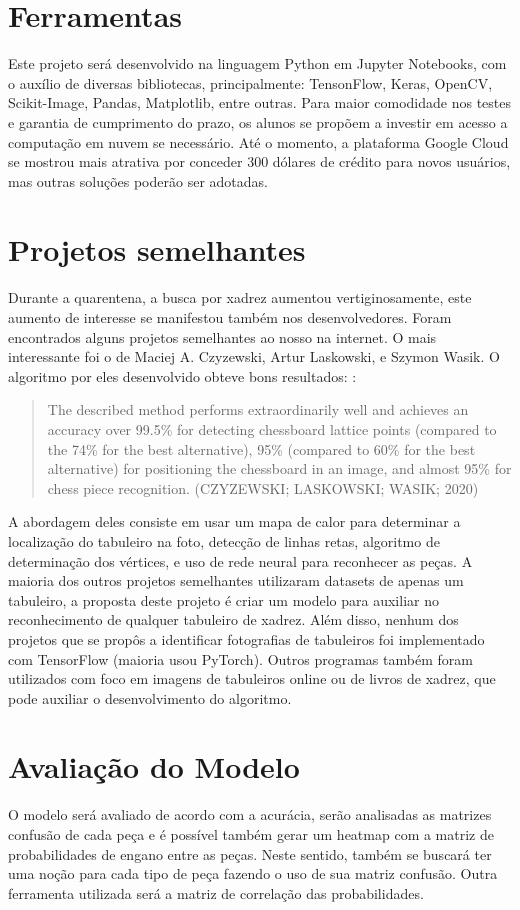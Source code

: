 \documentclass[a4paper,12pt,twoside]{article}
\begin{document}
\section{Ferramentas}
Este projeto será desenvolvido na linguagem Python em Jupyter Notebooks, com o auxílio de diversas bibliotecas, principalmente: TensonFlow, Keras, OpenCV, Scikit-Image, Pandas, Matplotlib, entre outras.
Para maior comodidade nos testes e garantia de cumprimento do prazo, os alunos se propõem a investir em acesso a computação em nuvem se necessário.
Até o momento, a plataforma Google Cloud se mostrou mais atrativa por conceder 300 dólares de crédito para novos usuários, mas outras soluções poderão ser adotadas.

\section{Projetos semelhantes}
Durante a quarentena, a busca por xadrez aumentou vertiginosamente, este aumento de interesse se manifestou também nos desenvolvedores. Foram encontrados alguns projetos semelhantes ao nosso na internet. O mais interessante foi o de Maciej A. Czyzewski, Artur Laskowski, e Szymon Wasik. O algoritmo por eles desenvolvido obteve bons resultados:
\cite{czy20}:
\blockquote{The described method performs extraordinarily well and achieves an accuracy over 99.5\% for detecting chessboard lattice points (compared to the 74\% for the best alternative), 95\% (compared to 60\% for the best alternative) for positioning the chessboard in an image, and almost 95\% for chess piece recognition. (CZYZEWSKI; LASKOWSKI; WASIK; 2020)}

A abordagem deles consiste em usar um mapa de calor para determinar a localização do tabuleiro na foto, detecção de linhas retas, algoritmo de determinação dos vértices, e uso de rede neural para reconhecer as peças.
A maioria dos outros projetos semelhantes utilizaram datasets de apenas um tabuleiro, a proposta deste projeto é criar um modelo para auxiliar no reconhecimento de qualquer tabuleiro de xadrez.
Além disso, nenhum dos projetos que se propôs a identificar fotografias de tabuleiros foi implementado com TensorFlow (maioria usou PyTorch).
Outros programas também foram utilizados com foco em imagens de tabuleiros online ou de livros de xadrez, que pode auxiliar o desenvolvimento do algoritmo.

\section{Avaliação do Modelo}
O modelo será avaliado de acordo com a acurácia, serão analisadas as matrizes confusão de cada peça e é possível também gerar um heatmap com a matriz de probabilidades de engano entre as peças.
Neste sentido, também se buscará ter uma noção para cada tipo de peça fazendo o uso de sua matriz confusão. Outra ferramenta utilizada será a matriz de correlação das probabilidades.

\nocite{*}
\printbibliography
\end{document}
